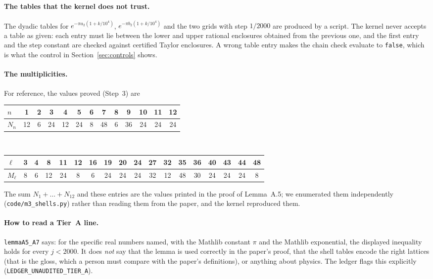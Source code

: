 \documentclass[11pt]{article}
\newcommand{\lean}[1]{\texttt{#1}}
\begin{document}
\paragraph{The tables that the kernel does not trust.} The dyadic tables for $e^{-\pi a_2(1+k/10^4)}$, $e^{-\pi b_2(1+k/10^4)}$ and the two grids with step $1/2000$ are produced by a script. The kernel never accepts a table as given: each entry
must lie between the lower and upper rational enclosures obtained from the previous one, and the first entry and the step constant are checked against certified Taylor enclosures. A wrong table entry makes the chain check evaluate to \lean{false}, which is what the control in Section~\ref{sec:controls} shows.
\paragraph{The multiplicities.} For reference, the values proved (Step~3) are
\begin{center}\small\begin{tabular}{@{}l|cccccccccccc@{}}
$n$ & 1&2&3&4&5&6&7&8&9&10&11&12\\\hline
$N_n$ & 12&6&24&12&24&8&48&6&36&24&24&24
\end{tabular}\\[4pt]
\begin{tabular}{@{}l|ccccccccccccccccc@{}}
$\ell$ & 3&4&8&11&12&16&19&20&24&27&32&35&36&40&43&44&48\\\hline
$M_\ell$ & 8&6&12&24&8&6&24&24&24&32&12&48&30&24&24&24&8
\end{tabular}\end{center}
The sum $N_1+\dots+N_{12}$ and these entries are the values printed in the proof of Lemma~A.5; we enumerated them independently (\texttt{code/m3\_shells.py}) rather than reading them from the paper, and the kernel reproduced them.
\paragraph{How to read a Tier~A line.} \lean{lemmaA5\_A7} says: for the specific real numbers named, with the Mathlib constant $\pi$ and the Mathlib exponential, the displayed inequality holds for every $j<2000$. It does \emph{not} say that the lemma is used correctly in the paper's proof, that
the shell tables encode the right lattices (that is the gloss, which a person must compare with the paper's definitions), or anything about physics. The ledger flags this explicitly (\texttt{LEDGER\_UNAUDITED\_TIER\_A}).
\end{document}
